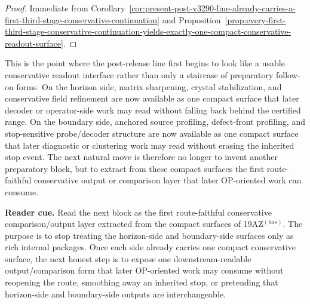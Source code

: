 \begin{proof}
Immediate from Corollary~\ref{cor:present-post-v3290-line-already-carries-a-first-third-stage-conservative-continuation} and Proposition~\ref{prop:every-first-third-stage-conservative-continuation-yields-exactly-one-compact-conservative-readout-surface}.
\end{proof}

\begin{remark}
\label{rem:what-the-first-compact-conservative-readout-surface-now-buys}
This is the point where the post-release line first begins to look like a usable conservative readout interface rather than only a staircase of preparatory follow-on forms. On the horizon side, matrix sharpening, crystal stabilization, and conservative field refinement are now available as one compact surface that later decoder or operator-side work may read without falling back behind the certified range. On the boundary side, anchored source profiling, defect-front profiling, and stop-sensitive probe/decoder structure are now available as one compact surface that later diagnostic or clustering work may read without erasing the inherited stop event. The next natural move is therefore no longer to invent another preparatory block, but to extract from these compact surfaces the first route-faithful conservative output or comparison layer that later OP-oriented work can consume.
\end{remark}


\noindent\textbf{Reader cue.} Read the next block as the first route-faithful conservative comparison/output layer extracted from the compact surfaces of 19AZ$^{(6as)}$. The purpose is to stop treating the horizon-side and boundary-side surfaces only as rich internal packages. Once each side already carries one compact conservative surface, the next honest step is to expose one downstream-readable output/comparison form that later OP-oriented work may consume without reopening the route, smoothing away an inherited stop, or pretending that horizon-side and boundary-side outputs are interchangeable.

